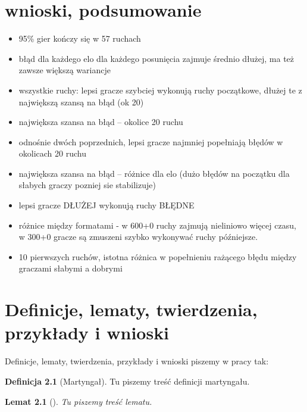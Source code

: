 \documentclass[inzynierska]{pwr_wmat_praca_dyplomowa}
\theoremstyle{plain}
\numberwithin{theorem}{chapter}
\newtheorem{lemma}[theorem]{Lemat}
\theoremstyle{definition}
\numberwithin{theorem}{chapter}
\newtheorem{definition}[theorem]{Definicja}
\begin{document}
\chapter{wnioski, podsumowanie}
\begin{itemize}
	\item 95\% gier kończy się w 57 ruchach
	\item błąd dla każdego elo dla każdego posunięcia zajmuje średnio dłużej, ma też zawsze większą wariancje
	\item wszystkie ruchy: lepsi gracze szybciej wykonują ruchy początkowe, dłużej te z największą szansą na błąd (ok 20)
	\item największa szansa na błąd -- okolice 20 ruchu
	\item odnośnie dwóch poprzednich, lepsi gracze najmniej popełniają błędów w okolicach 20 ruchu
	\item największa szansa na błąd -- różnice dla elo (dużo błędów na początku 
	dla słabych graczy pozniej sie stabilizuje)
	\item lepsi gracze DŁUŻEJ wykonują ruchy BŁĘDNE
	\item różnice między formatami - w 600+0 ruchy zajmują nieliniowo więcej czasu, w 300+0 gracze są zmuszeni szybko wykonywać ruchy późniejsze.
	\item 10 pierwszych ruchów, istotna różnica w popełnieniu rażącego błędu między graczami słabymi a dobrymi
\end{itemize}


\chapter{Definicje, lematy, twierdzenia, przykłady i wnioski}
Definicje, lematy, twierdzenia, przykłady i wnioski piszemy w pracy tak:
\begin{definition}[Martyngał]
	Tu piszemy treść definicji martyngału.
\end{definition}
\begin{lemma}[]%
	Tu piszemy treść lematu.
\end{lemma}


\end{document}
